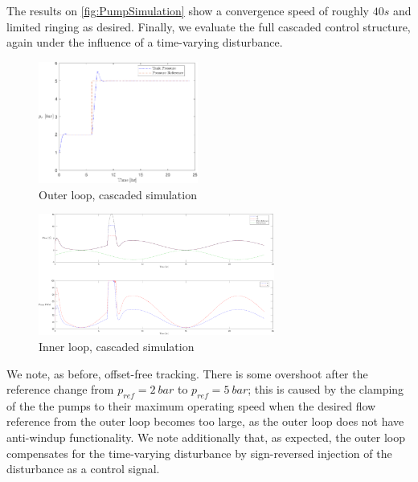 The results on \cref{fig:PumpSimulation} show a convergence speed of roughly $40 \si{s}$ and limited ringing as desired. Finally, we evaluate the full cascaded control structure, again under the influence of a time-varying disturbance.

\begin{figure}[h!]
	\includegraphics[height=4cm, width=\linewidth]{Graphics/FullSimPressures.pdf}
	\caption{Outer loop, cascaded simulation}
	\label{fig:FullSimPressure}
\end{figure}

\begin{figure}[h!]
	\includegraphics[height=4cm, width=\linewidth]{Graphics/FullSimFlows.pdf}
	\caption{Inner loop, cascaded simulation}
	\label{fig:FullSimFlows}
\end{figure}

We note, as before, offset-free tracking. There is some overshoot after the reference change from $p_{ref} = 2 \ \si{bar}$ to $p_{ref} = 5 \ \si{bar}$; this is caused by the clamping of the the pumps to their maximum operating speed when the desired flow reference from the outer loop becomes too large, as the outer loop does not have anti-windup functionality. We note additionally that, as expected, the outer loop compensates for the time-varying disturbance by sign-reversed injection of the disturbance as a control signal.



